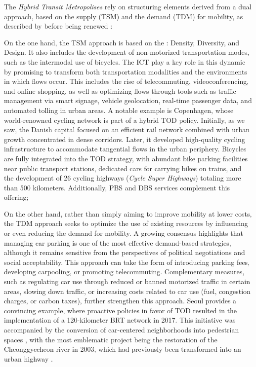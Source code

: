 \begin{refsegment}
The \textsl{Hybrid Transit Metropolises} rely on structuring elements derived from a dual approach, based on the supply (\acrshort{TSM}) and the demand (\acrshort{TDM}) for mobility, as described by \textcolor{blue}{\textcite[67]{cervero_transit_1998}} before being renewed \textcolor{blue}{\autocite[137-143]{cervero_transit_2020}}:
    \begin{customitemize}
\item On the one hand, the \acrshort{TSM} approach is based on the : Density, Diversity, and Design. It also includes the development of non-motorized transportation modes, such as the intermodal use of bicycles. The \acrshort{ICT} play a key role in this dynamic by promising to transform both transportation modalities and the environments in which flows occur. This includes the rise of telecommuting, videoconferencing, and online shopping, as well as optimizing flows through tools such as traffic management via smart signage, vehicle geolocation, real-time passenger data, and automated tolling in urban areas. A notable example is Copenhagen, whose world-renowned cycling network is part of a hybrid \acrshort{TOD} policy. Initially, as we saw, the Danish capital focused on an efficient rail network combined with urban growth concentrated in dense corridors. Later, it developed high-quality cycling infrastructure to accommodate tangential flows in the urban periphery. Bicycles are fully integrated into the \acrshort{TOD} strategy, with abundant bike parking facilities near public transport stations, dedicated cars for carrying bikes on trains, and the development of 26 cycling highways (\textsl{Cycle Super Highways}) totaling more than 500 kilometers. Additionally, \acrshort{PBS} and \acrshort{DBS} services complement this offering;
\item On the other hand, rather than simply aiming to improve mobility at lower costs, the \acrshort{TDM} approach seeks to optimize the use of existing resources by influencing or even reducing the demand for mobility. A growing consensus highlights that managing car parking is one of the most effective demand-based strategies, although it remains sensitive from the perspectives of political negotiations and social acceptability. This approach can take the form of introducing parking fees, developing carpooling, or promoting telecommuting. Complementary measures, such as regulating car use through reduced or banned motorized traffic in certain areas, slowing down traffic, or increasing costs related to car use (fuel, congestion charges, or carbon taxes), further strengthen this approach. Seoul provides a convincing example, where proactive policies in favor of \acrshort{TOD} resulted in the implementation of a 120-kilometer \acrshort{BRT} network in 2017. This initiative was accompanied by the conversion of car-centered neighborhoods into pedestrian spaces \textcolor{blue}{\autocite[6]{prayogi_bus_2018}}, with the most emblematic project being the restoration of the Cheonggyecheon river in 2003, which had previously been transformed into an urban highway \textcolor{blue}{\autocite[]{shin_cheongyecheon_2013}}.

\end{customitemize}
\end{refsegment}
